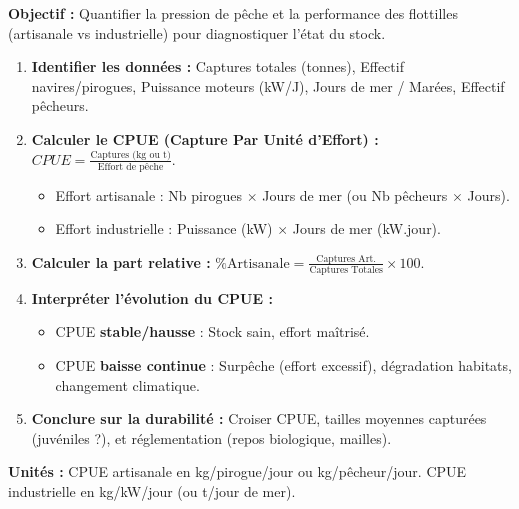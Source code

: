\documentclass[11pt]{article}
\newcommand{\cle}[1]{{\popxbold\color{popdark}#1}}
\begin{document}
\begin{methode}
\textbf{Objectif :} Quantifier la pression de pêche et la performance des flottilles (artisanale vs industrielle) pour diagnostiquer l'état du stock.
\begin{enumerate}
    \item \textbf{Identifier les données :} Captures totales (tonnes), Effectif navires/pirogues, Puissance moteurs (kW/J), Jours de mer / Marées, Effectif pêcheurs.
    \item \textbf{Calculer le CPUE (Capture Par Unité d'Effort) :} $CPUE = \frac{\text{Captures (kg ou t)}}{\text{Effort de pêche}}$.
    \begin{itemize}
        \item Effort artisanale : Nb pirogues $\times$ Jours de mer (ou Nb pêcheurs $\times$ Jours).
        \item Effort industrielle : Puissance (kW) $\times$ Jours de mer (kW.jour).
    \end{itemize}
    \item \textbf{Calculer la part relative :} $\% \text{Artisanale} = \frac{\text{Captures Art.}}{\text{Captures Totales}} \times 100$.
    \item \textbf{Interpréter l'évolution du CPUE :}
    \begin{itemize}
        \item CPUE \textbf{stable/hausse} : Stock sain, effort maîtrisé.
        \item CPUE \textbf{baisse continue} : \cle{Surpêche} (effort excessif), dégradation habitats, changement climatique.
    \end{itemize}
    \item \textbf{Conclure sur la durabilité :} Croiser CPUE, tailles moyennes capturées (juvéniles ?), et réglementation (repos biologique, mailles).
\end{enumerate}
\textbf{Unités :} CPUE artisanale en kg/pirogue/jour ou kg/pêcheur/jour. CPUE industrielle en kg/kW/jour (ou t/jour de mer).
\end{methode}
\end{document}
